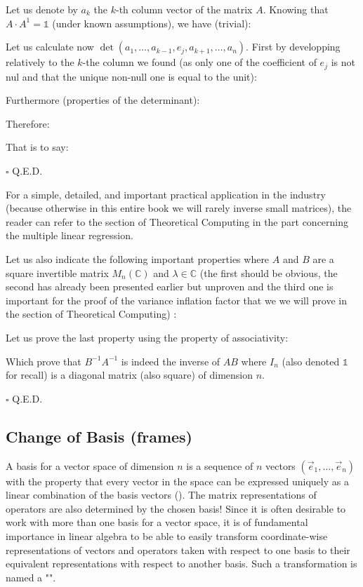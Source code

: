 	\begin{dem}
	Let us denote by $a_k$ the $k$-th column vector of the matrix $A$. Knowing that $A\cdot A^{1}=\mathds{1}$ (under known assumptions), we have (trivial):
	
	Let us calculate now $\det(a_1,\ldots,a_{k-1},e_j,a_{k+1},\ldots,a_n)$. First by developping relatively to the $k$-the column we found (as only one of the coefficient of $e_j$ is not nul and that the unique non-null one is equal to the unit):
	
	Furthermore (properties of the determinant):
	
	Therefore:
	
	That is to say:
	
	\begin{flushright}
		$\square$  Q.E.D.
	\end{flushright}
	\end{dem}
	For a simple, detailed, and important practical application in the industry (because otherwise in this entire book we will rarely inverse small matrices), the reader can refer to the section of Theoretical Computing in the part concerning the multiple linear regression.
	
	Let us also indicate the following important properties where $A$ and $B$ are a square invertible matrix $M_{n}(\mathbb{C})$ and $\lambda\in\mathbb{C}$ (the first should be obvious, the second has already been presented earlier but unproven and the third one is important for the proof of the variance inflation factor that we we will prove in the section of Theoretical Computing) :
	
	Let us prove the last property using the property of associativity:
	\begin{dem}
	
	Which prove that $B^{-1}A^{-1}$ is indeed the inverse of $AB$ where $I_n$ (also denoted $\mathds{1}$ for recall) is a diagonal matrix (also square) of dimension $n$.
	\begin{flushright}
		$\square$  Q.E.D.
	\end{flushright}
	\end{dem}
	
	\pagebreak
	\subsection{Change of Basis (frames)}
	A basis for a vector space of dimension $n$ is a sequence of $n$ vectors $(\vec{e}_1, …, \vec{e}_n)$ with the property that every vector in the space can be expressed uniquely as a linear combination of the basis vectors (). The matrix representations of operators are also determined by the chosen basis! Since it is often desirable to work with more than one basis for a vector space, it is of fundamental importance in linear algebra to be able to easily transform coordinate-wise representations of vectors and operators taken with respect to one basis to their equivalent representations with respect to another basis. Such a transformation is named a "".
	
